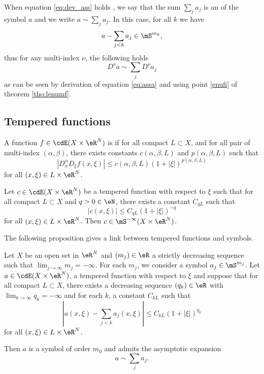When equation \eqref{eq:dev_ass} holds , we say that the sum $\sum_ja_j$ is an  of the symbol $a$ and we write $a\sim\sum_ja_j$. In this case, for all $k$ we have
\begin{equation} \label{eq:assa}
  a-\sum_{j<k}a_j\in\mS^{m_k},
\end{equation}
thus for any multi-index $\nu$, the following holds
\[ 
  D^{\nu}a\sim\sum_jD^{\nu}a_j
\]
as can be seen by derivation of equation \eqref{eq:assa} and using point \ref{enufi} of theorem \ref{tho:lenumf}.

\subsection{Tempered functions}

A function $f\in\cdE(X\times\eR^N)$ is  if for all compact $L\subset X$, and for all pair of multi-index $(\alpha,\beta)$, there exists constants $c(\alpha,\beta,L)$ and $p(\alpha,\beta,L)$ such that
 \[ 
|D_x^{\alpha}D_{\xi}f(x,\xi)|\leq c(\alpha,\beta,L)(1+|\xi|)^{p(\alpha,\beta,L)}
\]
for all $(x,\xi)\in L\times\eR^N$.


\begin{lemma} 
Let $c\in\cdE(X\times\eR^N)$ be a tempered function with respect to $\xi$ such that for all compact $L\subset X$ and $q>0\in\eN$, there exists a constant $C_{qL}$ such that
\[ 
|c(x,\xi)|\leq C_{qL}(1+|\xi|)^{-q}
\]
 for all $(x,\xi)\in L\times\eR^N$. Then $c\in\mS^{-\infty}(X\times\eR^N)$.
\label{lem:csymbol}
\end{lemma}

The following proposition gives a link between tempered functions and symbols.


\begin{proposition}
Let $X$ be an open set in $\eR^N$ and $(m_j)\in\eR$ a strictly decreasing sequence such that $\lim_{j\to\infty}m_j=-\infty$. For each $m_j$, we consider a symbol $a_j\in\mS^{m_j}$. Let $a\in\cdE(X\times\eR^N)$, a tempered function with respect to $\xi$ and suppose that for all compact $L\subset X$, there exists a decreasing sequence $(q_k)\in\eR$ with $\lim_{k\to\infty}q_k=-\infty$ and for each $k$, a constant $C_{kL}$ such that
\begin{equation}
   |a(x,\xi)-\sum_{j<k}a_j(x,\xi)|\leq C_{kL}(1+|\xi|)^{q_k}
\end{equation}
for all $(x,\xi)\in L\times\eR^N$.

Then $a$ is a symbol of order $m_0$ and admits the asymptotic expansion 
\[ 
a\sim\sum_ja_j.
\]

\end{proposition}

